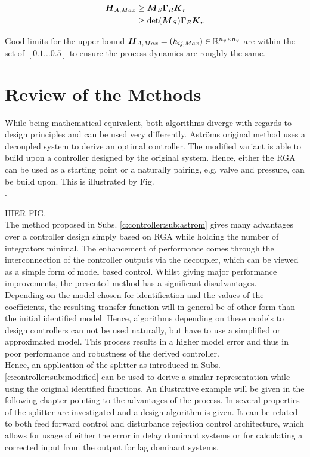 \begin{align}
\begin{split}
\mbox{\boldmath$H$}_{A,Max} &\geq \mbox{\boldmath$M$}_S \mbox{\boldmath$\Gamma$}_R \mbox{\boldmath$K$}_r \\ 
&\geq \det(\mbox{\boldmath$M$}_S) \mbox{\boldmath$\Gamma$}_R \mbox{\boldmath$K$}_r 
\end{split}
\end{align}

Good limits for the upper bound $\mbox{\boldmath$H$}_{A,Max} = \left( h_{ij,Max}\right) \in \mathbb{R}^{n_y \times n_y}$ are within the set of $\left[0.1 \dots 0.5 \right]$ to ensure the process dynamics are roughly the same.

\section{Review of the Methods}\label{c:controller:s:review}

While being mathematical equivalent, both algorithms diverge with regards to design principles and can be used very differently. Astr\"oms original method uses a decoupled system to derive an optimal controller. The modified variant is able to build upon a controller designed by the original system. Hence, either the RGA can be used as a starting point or a naturally pairing, e.g. valve and pressure, can be build upon. This is illustrated by Fig. \\.

HIER FIG.\\

The method proposed in Subs. \ref{c:controller:sub:astrom} gives many advantages over a controller design simply based on RGA while holding the number of integrators minimal. The enhancement of performance comes through the interconnection of the controller outputs via the decoupler, which can be viewed as a simple form of model based control. Whilst giving major performance improvements, the presented method has a significant disadvantages.\\

Depending on the model chosen for identification and the values of the coefficients, the resulting transfer function will in general be of other form than the initial identified model. Hence, algorithms depending on these models to design controllers can not be used naturally, but have to use a simplified or approximated model. This process results in a higher model error and thus in poor performance and robustness of the derived controller.\\

Hence, an application of the splitter as introduced in Subs.\ref{c:controller:sub:modified} can be used to derive a similar representation while using the original identified functions. An illustrative example will be given in the following chapter pointing to the advantages of the process. In \cite{Wang2006} several properties of the splitter are investigated and a design algorithm is given. It can be related to both feed forward control and disturbance rejection control architecture, which allows for usage of either the error in delay dominant systems or for calculating a corrected input from the output for lag dominant systems.

